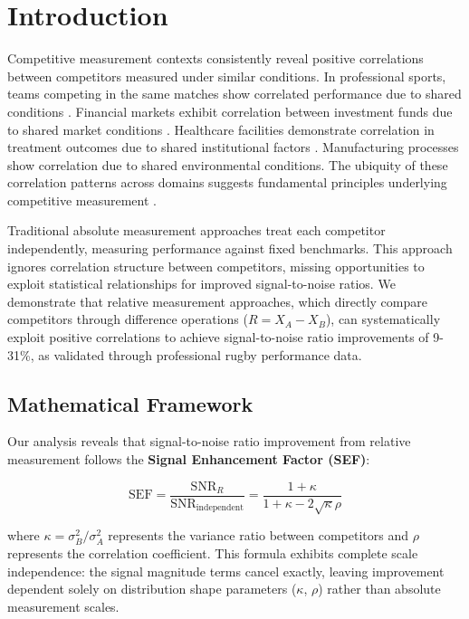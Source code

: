 \section{Introduction}

Competitive measurement contexts consistently reveal positive correlations between competitors measured under similar conditions. In professional sports, teams competing in the same matches show correlated performance due to shared conditions \cite{scott2023performance, scott2023classifying}. Financial markets exhibit correlation between investment funds due to shared market conditions \cite{carhart1997persistence, fama1993common}. Healthcare facilities demonstrate correlation in treatment outcomes due to shared institutional factors \cite{iezzoni1997risk, normand2016statistical}. Manufacturing processes show correlation due to shared environmental conditions. The ubiquity of these correlation patterns across domains suggests fundamental principles underlying competitive measurement \cite{stefani2011measurement}.

Traditional absolute measurement approaches treat each competitor independently, measuring performance against fixed benchmarks. This approach ignores correlation structure between competitors, missing opportunities to exploit statistical relationships for improved signal-to-noise ratios. We demonstrate that relative measurement approaches, which directly compare competitors through difference operations ($R = X_A - X_B$), can systematically exploit positive correlations to achieve signal-to-noise ratio improvements of 9-31\%, as validated through professional rugby performance data.

\subsection{Mathematical Framework}

Our analysis reveals that signal-to-noise ratio improvement from relative measurement follows the \textbf{Signal Enhancement Factor (SEF)}:

$$\text{SEF} = \frac{\text{SNR}_R}{\text{SNR}_{\text{independent}}} = \frac{1 + \kappa}{1 + \kappa - 2\sqrt{\kappa}\rho}$$

where $\kappa = \sigma^2_B/\sigma^2_A$ represents the variance ratio between competitors and $\rho$ represents the correlation coefficient. This formula exhibits complete scale independence: the signal magnitude terms cancel exactly, leaving improvement dependent solely on distribution shape parameters ($\kappa$, $\rho$) rather than absolute measurement scales.

